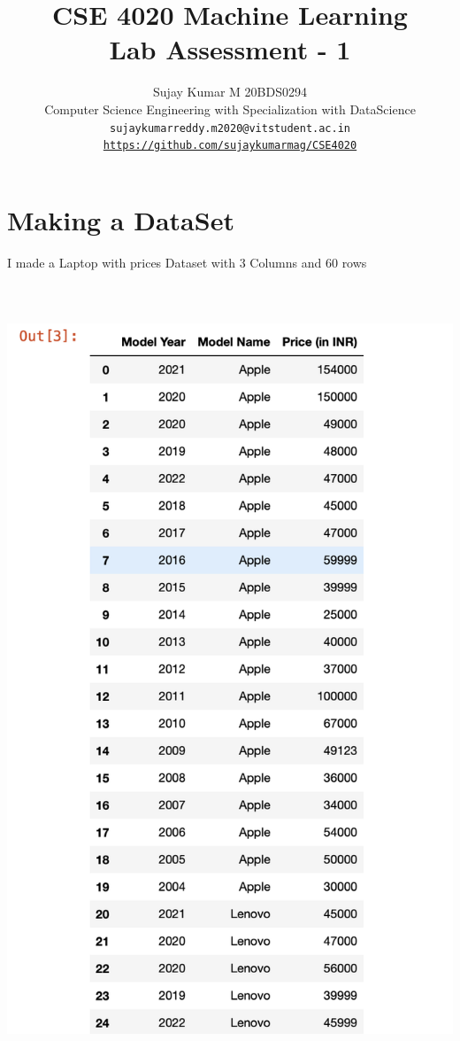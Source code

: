 \documentclass{article}
\title{CSE 4020 Machine Learning \\ Lab Assessment - 1  }
\author{Sujay Kumar M 20BDS0294\\ \small Computer Science Engineering with Specialization with DataScience\\ \tt sujaykumarreddy.m2020@vitstudent.ac.in
	\\ \url{https://github.com/sujaykumarmag/CSE4020}}
\begin{document}
\maketitle
\section{Making a DataSet}
I made a Laptop with prices Dataset with 3 Columns and 60 rows \\\\\\\
\includegraphics[scale=0.6]{images/1.png}
\end{document}
